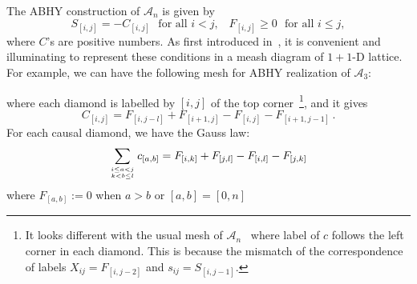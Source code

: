 \documentclass[hidelinks,12pt]{article}
\begin{document}
The ABHY construction of $\mathscr A_n$ is given by 
\[
	S_{[i,j]}=-C_{[i,j]} \,\,\text{ for all $i<j$,}\quad
	F_{[i,j]}\geq 0 \,\,\text{ for all $i\leq j$},
\]
where $C$'s are positive numbers. As first introduced in~\cite{Arkani-Hamed:2019vag,Bazier-Matte:2018rat}, it is convenient and illuminating to represent these conditions in a meash diagram of $1+1$-D lattice. For example, we can have the following mesh for ABHY realization of $\mathscr A_3$:  
\begin{center}
\end{center}
where each diamond is labelled by $[i,j]$ of the top corner~\footnote{
It looks different with the usual mesh of $\mathscr A_n$~\cite{Arkani-Hamed:2019vag} where label of $c$ follows the left corner
in each diamond. This is because the mismatch of the correspondence of labels 
$X_{ij}=F_{[i,j-2]}$ and $s_{ij}=S_{[i,j-1]}$.
}, and it gives
\begin{equation}\label{CinFA}
	C_{[i,j]}=F_{[i,j-l]}+F_{[i+1,j]}-F_{[i,j]}-F_{[i+1,j-1]}\,.
\end{equation}
For each causal diamond, we have the Gauss law:
\[
	\sum_{i\leq a<j\atop{k<b\leq l}} c_{[a,b]} = 
	F_{[i,k]}+F_{[j,l]}-F_{[i,l]}-F_{[j,k]}
\]
where $F_{[a,b]}:=0$ when $a>b$ or $[a,b]=[0,n]$
\end{document}
